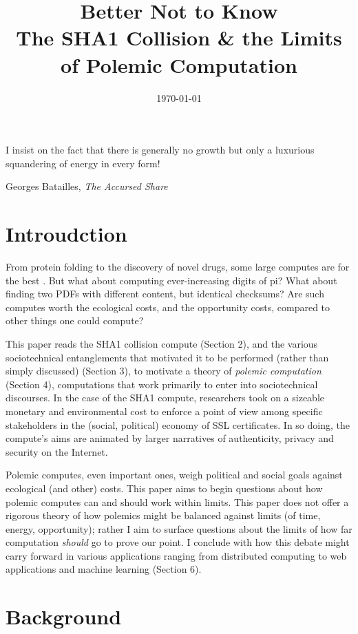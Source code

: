 \documentclass[sigconf]{acmart}
\date{\today}
\title{Better Not to Know\\\medskip
\large The SHA1 Collision \& the Limits of Polemic Computation}
\begin{document}
\maketitle

\epigraph{I insist on the fact that there is generally no growth but only a luxurious squandering of energy in every form!}{Georges Batailles, \textit{The Accursed Share}}

\section{Introudction}
\label{sec:org38f0146}

From protein folding to the discovery of novel drugs,
some large computes are for the best
\cite{Anderson2004}.
But what about computing ever-increasing digits of pi?
What about finding two PDFs with different content, but identical checksums?
Are such computes worth
the ecological costs, and the opportunity costs, compared to other things one could compute?

This paper reads the SHA1 collision compute (Section 2), and the various sociotechnical entanglements that motivated it to be performed (rather than simply discussed) (Section 3),
to motivate a theory of \emph{polemic computation} (Section 4), 
computations that
work primarily to enter into sociotechnical discourses.
In the case of the SHA1 compute, researchers took on a sizeable monetary and environmental cost
to enforce a point of view among specific stakeholders in the (social, political) economy of SSL certificates.
In so doing, the compute's aims are animated by
larger narratives of authenticity, privacy and security on the Internet.

Polemic computes, even important ones, weigh political and social goals against ecological (and other) costs.
This paper aims to begin questions about how polemic computes can and should work within limits.
This paper does not offer a rigorous theory of how polemics might be balanced against limits (of time, energy, opportunity);
rather I aim to surface questions about the limits of how far computation \emph{should} go to prove our point.
I conclude with how this debate might carry forward in various applications ranging from distributed computing to web applications and machine learning (Section 6).


\section{Background}
\label{sec:org6eacf73}
\end{document}
